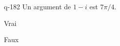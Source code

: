 \begin{truefalse}{q-182}
Un argument de $1-i$ est $7\pi/4$.
\item* Vrai
\item Faux
\end{truefalse}

